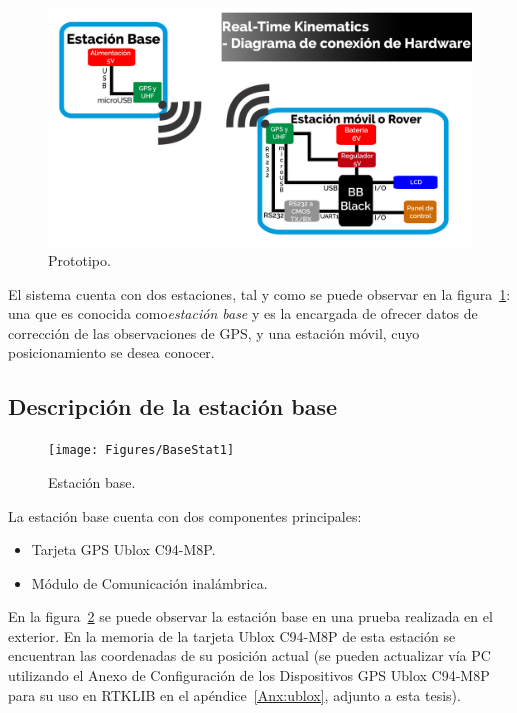 \begin{figure}[H]
\centering
\includegraphics[scale=0.444]{Figures/DiagFinal}
\caption[Prototipo.]{Prototipo.}
\label{fig:diaghard}
\end{figure}

El sistema cuenta con dos estaciones, tal y como se puede observar en la figura~\ref{fig:diaghard}:  una que es conocida como\textit{estación base} y es la encargada de ofrecer datos de corrección de las observaciones de GPS, y una estación móvil, cuyo posicionamiento se desea conocer. 

\subsection{Descripción de la estación base}

\begin{figure}[H]
\centering
\texttt{[image: Figures/BaseStat1]}
\caption[Estación base.]{Estación base.}
\label{fig:estbase}
\end{figure}

La estación base cuenta con dos componentes principales:

\begin{itemize}
\item Tarjeta GPS Ublox C94-M8P.
\item Módulo de Comunicación inalámbrica.
\end{itemize}

En la figura~\ref{fig:estbase} se puede observar la estación base en una prueba realizada en el exterior. En la memoria de la tarjeta Ublox C94-M8P de esta estación se encuentran las coordenadas de su posición actual (se pueden actualizar vía PC utilizando el Anexo de Configuración de los Dispositivos GPS Ublox C94-M8P para su uso en RTKLIB en el apéndice~\ref{Anx:ublox}, adjunto a esta tesis).\\

